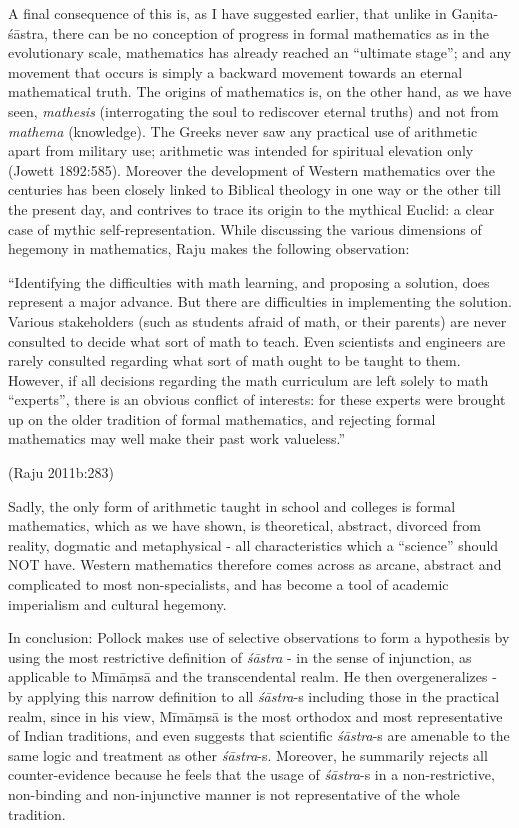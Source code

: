 A final consequence of this is, as I have suggested earlier, that unlike in Gaṇita-śāstra, there can be no conception of progress in formal mathematics as in the evolutionary scale, mathematics has already reached an ``ultimate stage''; and any movement that occurs is simply a backward movement towards an eternal mathematical truth. The origins of mathematics is, on the other hand, as we have seen, {\sl mathesis} (interrogating the soul to rediscover eternal truths) and not from {\sl mathema} (knowledge). The Greeks never saw any practical use of arithmetic apart from military use; arithmetic was intended for spiritual elevation only (Jowett 1892:585). Moreover the development of Western mathematics over the centuries has been closely linked to Biblical theology in one way or the other till the present day, and contrives to trace its origin to the mythical Euclid: a clear case of mythic self-representation. While discussing the various dimensions of hegemony in mathematics, Raju makes the following observation:
\begin{myquote}
``Identifying the difficulties with math learning, and proposing a solution, does represent a major advance. But there are difficulties in implementing the solution. Various stakeholders (such as students afraid of math, or their parents) are never consulted to decide what sort of math to teach. Even scientists and engineers are rarely consulted regarding what sort of math ought to be taught to them. However, if all decisions regarding the math curriculum are left solely to math ``experts'', there is an obvious conflict of interests: for these experts were brought up on the older tradition of formal mathematics, and rejecting formal mathematics may well make their past work valueless.'' 

\hfill (Raju 2011b:283) 
\end{myquote}
Sadly, the only form of arithmetic taught in school and colleges is formal mathematics, which as we have shown, is theoretical, abstract, divorced from reality, dogmatic and metaphysical - all characteristics which a ``science'' should NOT have. Western mathematics therefore comes across as arcane, abstract and complicated to most non-specialists, and has become a tool of academic imperialism and cultural hegemony.

In conclusion: Pollock makes use of selective observations to form a hypothesis by using the most restrictive definition of {\sl śāstra} - in the sense of injunction, as applicable to Mīmāṃsā and the transcendental realm. He then overgeneralizes - by applying this narrow definition to all {\sl śāstra}-s including those in the practical realm, since in his view, Mīmāṃsā is the most orthodox and most representative of Indian traditions, and even suggests that scientific {\sl śāstra}-s are amenable to the same logic and treatment as other {\sl śāstra}-s. Moreover, he summarily rejects all counter-evidence because he feels that the usage of {\sl śāstra}-s in a non-restrictive, non-binding and non-injunctive manner is not representative of the whole tradition. 

